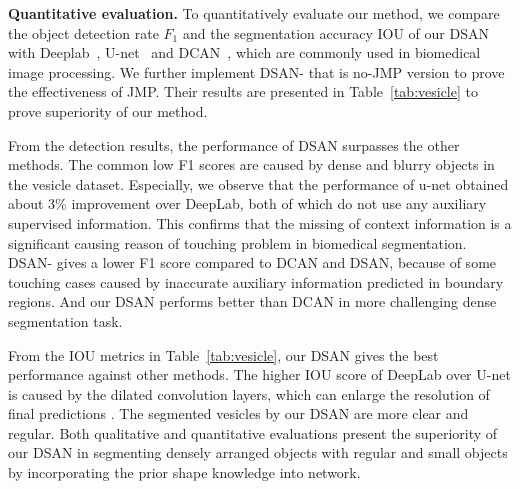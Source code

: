 \noindent\textbf{Quantitative evaluation.}
To quantitatively evaluate our method, we compare the object detection rate $F_1$ and the segmentation accuracy IOU of our DSAN with Deeplab~\cite{Chen2014a}, U-net~\cite{Ronneberger2015} and DCAN~\cite{Chen2016b}, which are commonly used in biomedical image processing.
We further implement DSAN- that is no-JMP version to prove the effectiveness of JMP.
Their results are presented in Table~\ref{tab:vesicle} to prove superiority of our method.

From the detection results, the performance of DSAN surpasses the other methods.
The common low F1 scores are caused by dense and blurry objects in the vesicle dataset.
Especially, we observe that the performance of u-net obtained about $3\%$ improvement over DeepLab, both of which do not use any auxiliary supervised information.
This confirms that the missing of context information is a significant causing reason of touching problem in biomedical segmentation.
DSAN- gives a lower F1 score compared to DCAN and DSAN, because of some touching cases caused by inaccurate auxiliary information predicted in boundary regions.
And our DSAN performs better than DCAN in more challenging dense segmentation task.

From the IOU metrics in Table~\ref{tab:vesicle}, our DSAN gives the best performance against other methods.
The higher IOU score of DeepLab over U-net is caused by the dilated convolution layers, which can enlarge the resolution of final predictions \cite{Chen2014a}.
The segmented vesicles by our DSAN are more clear and regular.
Both qualitative and quantitative evaluations present the superiority of our DSAN in segmenting densely arranged objects with regular and small objects by incorporating the prior shape knowledge into network.


